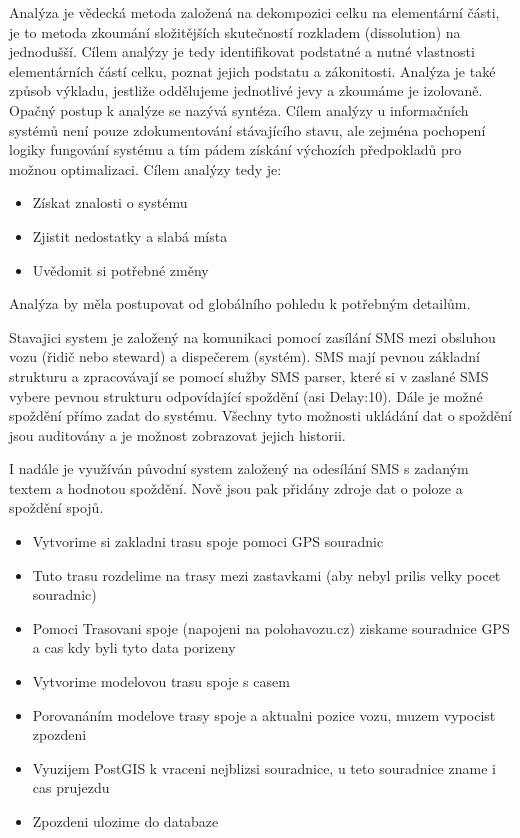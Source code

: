 

Analýza je vědecká metoda založená na dekompozici celku na elementární části, je to metoda
zkoumání složitějších skutečností rozkladem (dissolution) na jednodušší. Cílem analýzy je tedy identifikovat podstatné a nutné vlastnosti elementárních částí celku, poznat jejich podstatu a zákonitosti. Analýza je také způsob výkladu, jestliže oddělujeme jednotlivé jevy a zkoumáme je izolovaně. Opačný postup k analýze se nazývá syntéza. Cílem analýzy u informačních systémů není pouze zdokumentování stávajícího stavu, ale zejména pochopení logiky fungování systému a tím pádem získání výchozích předpokladů pro možnou optimalizaci.
Cílem analýzy tedy je:
\begin{itemize}
	\setlength{\parskip}{0pt}
	\setlength{\itemsep}{0pt}
	\item Získat znalosti o systému
	\item Zjistit nedostatky a slabá místa
	\item Uvědomit si potřebné změny
\end{itemize}
Analýza by měla postupovat od globálního pohledu k potřebným detailům.


Stavajici system je založený na komunikaci pomocí zasílání SMS mezi obsluhou vozu (řidič nebo steward) a dispečerem (systém). SMS mají pevnou základní strukturu a zpracovávají se pomocí služby SMS parser, které si v zaslané SMS vybere pevnou strukturu odpovídající spoždění (asi Delay:10). Dále je možné spoždění přímo zadat do systému. Všechny tyto možnosti ukládání dat o spoždění jsou auditovány a je možnost zobrazovat jejich historii.  

I nadále je využíván původní system založený na odesílání SMS s zadaným textem a hodnotou spoždění. Nově jsou pak přidány zdroje dat o poloze a spoždění spojů.

\begin{itemize}
	\item Vytvorime si zakladni trasu spoje pomoci GPS souradnic
	\item Tuto trasu rozdelime na trasy mezi zastavkami (aby nebyl prilis velky pocet souradnic)
	\item Pomoci Trasovani spoje (napojeni na polohavozu.cz) ziskame souradnice GPS a cas kdy byli tyto data porizeny
	\item Vytvorime modelovou trasu spoje s casem
	\item Porovanáním modelove trasy spoje a aktualni pozice vozu, muzem vypocist zpozdeni
	\item Vyuzijem PostGIS k vraceni nejblizsi souradnice, u teto souradnice zname i cas prujezdu
	\item Zpozdeni ulozime do databaze
\end{itemize}

